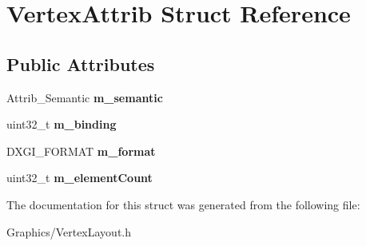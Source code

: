 \hypertarget{structVertexAttrib}{}\section{Vertex\+Attrib Struct Reference}
\label{structVertexAttrib}
\subsection*{Public Attributes}
\begin{DoxyCompactItemize}
\item 
\mbox{\label{structVertexAttrib_a24b1b8c664bb9fcb1c4b003cd0cc2ec8}} 
Attrib\+\_\+\+Semantic {\bfseries m\+\_\+semantic}
\item 
\mbox{\label{structVertexAttrib_a0296546d5574e720510da51bb38c4407}} 
uint32\+\_\+t {\bfseries m\+\_\+binding}
\item 
\mbox{\label{structVertexAttrib_a8fa91687284e0968de96ca277cdfd4c5}} 
D\+X\+G\+I\+\_\+\+F\+O\+R\+M\+AT {\bfseries m\+\_\+format}
\item 
\mbox{\label{structVertexAttrib_ad5351a7e80a0612c492a647f8d0308bb}} 
uint32\+\_\+t {\bfseries m\+\_\+element\+Count}
\end{DoxyCompactItemize}


The documentation for this struct was generated from the following file\+:\begin{DoxyCompactItemize}
\item 
Graphics/Vertex\+Layout.\+h\end{DoxyCompactItemize}
